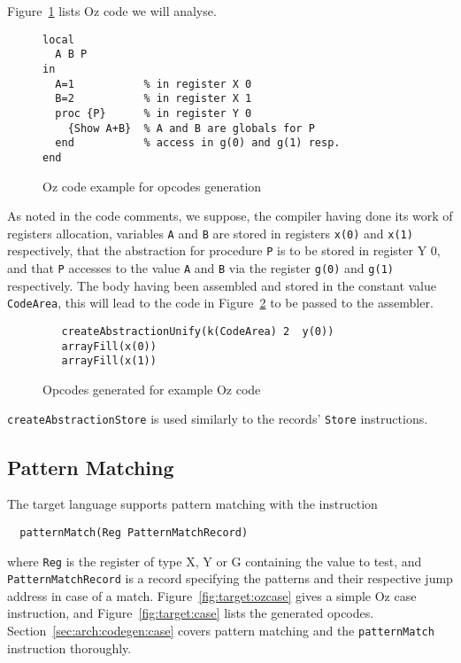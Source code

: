 \documentclass[a4paper]{memoir}
\begin{document}
Figure~\ref{fig:opcodes:procedures:example} lists Oz code we will analyse.

\begin{figure}[ht]
\begin{lstlisting}
local
  A B P
in
  A=1           % in register X 0
  B=2           % in register X 1
  proc {P}      % in register Y 0
    {Show A+B}  % A and B are globals for P
  end           % access in g(0) and g(1) resp.
end
\end{lstlisting}
\caption{Oz code example for opcodes generation}
\label{fig:opcodes:procedures:example}
\end{figure}


As noted in the code comments, we suppose, the compiler having done its work of
registers allocation, variables \lstinline!A! and \lstinline!B! are stored in
registers \lstinline!x(0)! and \lstinline!x(1)!
respectively, that the abstraction for procedure \lstinline!P! is to be stored in register Y
0, and that \lstinline!P! accesses to the value \lstinline!A! and \lstinline!B!
via the register \lstinline!g(0)! and \lstinline!g(1)!
respectively.
The body having been assembled and stored in the constant value
\lstinline!CodeArea!, this
will lead to the code in Figure~\ref{fig:opcodes:procedures:result} to be passed
to the assembler.
\begin{figure}[ht]
\begin{lstlisting}
   createAbstractionUnify(k(CodeArea) 2  y(0))
   arrayFill(x(0))
   arrayFill(x(1))
\end{lstlisting}
\caption{Opcodes generated for example Oz code}
\label{fig:opcodes:procedures:result}
\end{figure}

\lstinline!createAbstractionStore! is used similarly to the records'
\lstinline!Store! instructions.

\subsection{Pattern Matching}
The target language supports pattern matching with the instruction
\begin{lstlisting}
  patternMatch(Reg PatternMatchRecord)
\end{lstlisting}
where \lstinline!Reg! is the register of type X, Y or G containing the value to test, and
\lstinline!PatternMatchRecord! is a record specifying the patterns and their
respective jump address in case of a match.
Figure~\ref{fig:target:ozcase} gives a simple Oz case instruction, and Figure~\ref{fig:target:case} lists the generated opcodes.
Section~\ref{sec:arch:codegen:case} covers pattern matching and the \lstinline!patternMatch! instruction thoroughly.
 
\end{document}
